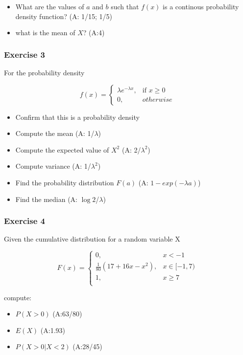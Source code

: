 \documentclass[
]{book}
\providecommand{\tightlist}{%
  \setlength{\itemsep}{0pt}\setlength{\parskip}{0pt}}
\begin{document}
\begin{itemize}
\item
  What are the values of \(a\) and \(b\) such that \(f(x)\) is a continous probability density function? (A: 1/15; 1/5)
\item
  what is the mean of \(X\)? (A:4)
\end{itemize}

\hypertarget{exercise-3-3}{%
\subsubsection{Exercise 3}\label{exercise-3-3}}

For the probability density

\[
    f(x)= 
\begin{cases}
    \lambda e^{-\lambda x},& \text{if } x \geq 0\\
    0,& otherwise 
\end{cases}
\]

\begin{itemize}
\tightlist
\item
  Confirm that this is a probability density
\item
  Compute the mean (A: 1/\(\lambda\))
\item
  Compute the expected value of \(X^2\) (A: 2/\(\lambda^2\))
\item
  Compute variance (A: 1/\(\lambda^2\))
\item
  Find the probability distribution \(F(a)\) (A: \(1-exp(-\lambda a)\))
\item
  Find the median (A: \(\log{2}\)/\(\lambda\))
\end{itemize}

\hypertarget{exercise-4-2}{%
\subsubsection{Exercise 4}\label{exercise-4-2}}

Given the cumulative distribution for a random variable X

\[
    F(x)= 
\begin{cases}
0, & x  < -1 \\
\frac{1}{80}(17+16x-x^2),& x \in [-1,7)\\
1,& x \geq 7\\
\end{cases}
\]

compute:

\begin{itemize}
\tightlist
\item
  \(P(X>0)\) (A:63/80)
\item
  \(E(X)\) (A:1.93)
\item
  \(P(X>0|X<2)\) (A:28/45)
\end{itemize}
\end{document}
